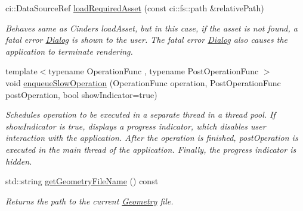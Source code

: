 \begin{DoxyCompactItemize}
ci\+::\+Data\+Source\+Ref \mbox{\hyperlink{classpepr3d_1_1_main_application_acfab9e02ede45fc96c2716370fdda96c}{load\+Required\+Asset}} (const ci\+::fs\+::path \&relative\+Path)
\begin{DoxyCompactList}\small\item\em Behaves same as Cinder\textquotesingle{}s load\+Asset, but in this case, if the asset is not found, a fatal error \mbox{\hyperlink{classpepr3d_1_1_dialog}{Dialog}} is shown to the user. The fatal error \mbox{\hyperlink{classpepr3d_1_1_dialog}{Dialog}} also causes the application to terminate rendering. \end{DoxyCompactList}\item 
\mbox{\label{classpepr3d_1_1_main_application_a4dcd1d98fa39ff7769fff445f7e5563c}} 
{\footnotesize template$<$typename Operation\+Func , typename Post\+Operation\+Func $>$ }\\void \mbox{\hyperlink{classpepr3d_1_1_main_application_a4dcd1d98fa39ff7769fff445f7e5563c}{enqueue\+Slow\+Operation}} (Operation\+Func operation, Post\+Operation\+Func post\+Operation, bool show\+Indicator=true)
\begin{DoxyCompactList}\small\item\em Schedules {\ttfamily operation} to be executed in a separate thread in a thread pool. If {\ttfamily show\+Indicator} is true, displays a progress indicator, which disables user interaction with the application. After the {\ttfamily operation} is finished, {\ttfamily post\+Operation} is executed in the main thread of the application. Finally, the progress indicator is hidden. \end{DoxyCompactList}\item 
\mbox{\label{classpepr3d_1_1_main_application_afd1be24404f0c0b26517970c77212603}} 
std\+::string \mbox{\hyperlink{classpepr3d_1_1_main_application_afd1be24404f0c0b26517970c77212603}{get\+Geometry\+File\+Name}} () const
\begin{DoxyCompactList}\small\item\em Returns the path to the current \mbox{\hyperlink{classpepr3d_1_1_geometry}{Geometry}} file. \end{DoxyCompactList}\end{DoxyCompactItemize}
